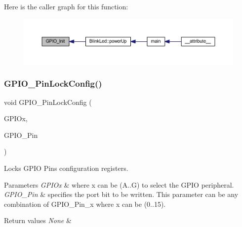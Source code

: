Here is the caller graph for this function\+:
\nopagebreak
\begin{figure}[H]
\begin{center}
\leavevmode
\includegraphics[width=350pt]{group___g_p_i_o___exported___functions_ga71abf9404261370d03cca449b88d3a65_icgraph}
\end{center}
\end{figure}
\mbox{\label{group___g_p_i_o___exported___functions_gad2f2e615928c69fd0d8c641a7cedaafc}} 
\subsubsection{\texorpdfstring{G\+P\+I\+O\+\_\+\+Pin\+Lock\+Config()}{GPIO\_PinLockConfig()}}
{\footnotesize\ttfamily void G\+P\+I\+O\+\_\+\+Pin\+Lock\+Config (\begin{DoxyParamCaption}\item[{\hyperlink{struct_g_p_i_o___type_def}{G\+P\+I\+O\+\_\+\+Type\+Def} $\ast$}]{G\+P\+I\+Ox,  }\item[{uint16\+\_\+t}]{G\+P\+I\+O\+\_\+\+Pin }\end{DoxyParamCaption})}



Locks G\+P\+IO Pins configuration registers. 


\begin{DoxyParams}{Parameters}
{\em G\+P\+I\+Ox} & where x can be (A..G) to select the G\+P\+IO peripheral. \\
\hline
{\em G\+P\+I\+O\+\_\+\+Pin} & specifies the port bit to be written. This parameter can be any combination of G\+P\+I\+O\+\_\+\+Pin\+\_\+x where x can be (0..15). \\
\hline
\end{DoxyParams}

\begin{DoxyRetVals}{Return values}
{\em None} & \\
\hline
\end{DoxyRetVals}


